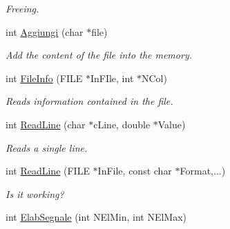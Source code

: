 \begin{DoxyCompactItemize}
\begin{DoxyCompactList}\small\item\em \-Freeing. \end{DoxyCompactList}\item 
\hypertarget{classVarDatFile_acd5ad8eb7d2e19f9341bbd969b8781f4}{int \hyperlink{classVarDatFile_acd5ad8eb7d2e19f9341bbd969b8781f4}{\-Aggiungi} (char $\ast$file)}\label{classVarDatFile_acd5ad8eb7d2e19f9341bbd969b8781f4}

\begin{DoxyCompactList}\small\item\em \-Add the content of the file into the memory. \end{DoxyCompactList}\item 
\hypertarget{classVarDatFile_a63cfc9d080698099e7831515b4fa7625}{int \hyperlink{classVarDatFile_a63cfc9d080698099e7831515b4fa7625}{\-File\-Info} (\-F\-I\-L\-E $\ast$\-In\-F\-Ile, int $\ast$\-N\-Col)}\label{classVarDatFile_a63cfc9d080698099e7831515b4fa7625}

\begin{DoxyCompactList}\small\item\em \-Reads information contained in the file. \end{DoxyCompactList}\item 
\hypertarget{classVarDatFile_ade68053131c1d1ddd635f526f93e4ff3}{int \hyperlink{classVarDatFile_ade68053131c1d1ddd635f526f93e4ff3}{\-Read\-Line} (char $\ast$c\-Line, double $\ast$\-Value)}\label{classVarDatFile_ade68053131c1d1ddd635f526f93e4ff3}

\begin{DoxyCompactList}\small\item\em \-Reads a single line. \end{DoxyCompactList}\item 
\hypertarget{classVarDatFile_acfb2b7579c38d629e6585e6f60373783}{int \hyperlink{classVarDatFile_acfb2b7579c38d629e6585e6f60373783}{\-Read\-Line} (\-F\-I\-L\-E $\ast$\-In\-File, const char $\ast$\-Format,...)}\label{classVarDatFile_acfb2b7579c38d629e6585e6f60373783}

\begin{DoxyCompactList}\small\item\em \-Is it working? \end{DoxyCompactList}\item 
\hypertarget{classVarDatFile_ab6e65ce9879959397314adb9c1f3d5e6}{int \hyperlink{classVarDatFile_ab6e65ce9879959397314adb9c1f3d5e6}{\-Elab\-Segnale} (int \-N\-El\-Min, int \-N\-El\-Max)}\label{classVarDatFile_ab6e65ce9879959397314adb9c1f3d5e6}


\end{DoxyCompactItemize}
